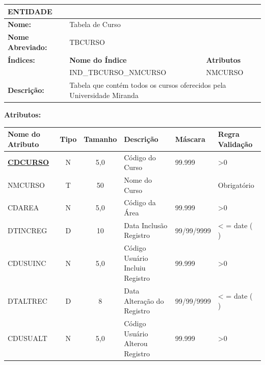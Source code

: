 \begin{landscape}

\footnotesize

\noindent
\begin{tabular}{|p{4.0cm}|p{12.0cm}|p{5.0cm}|}
\hline
\textbf{ENTIDADE} & & \\
\hline
\textbf{Nome:} & \multicolumn{2}{p{17.4cm}|}{Tabela de Curso} \\
\hline
\textbf{Nome Abreviado:} & \multicolumn{2}{p{17.4cm}|}{TBCURSO} \\
\hline
\textbf{Índices:} & \textbf{Nome do Índice} & \textbf{Atributos} \\
\hline
 & IND\_TBCURSO\_NMCURSO & NMCURSO \\
\hline
\textbf{Descrição:} & \multicolumn{2}{p{17.4cm}|}{Tabela que contém todos os cursos
oferecidos pela Universidade Miranda} \\
\hline
\end{tabular}

\vspace{0.4cm}

\noindent\textbf{Atributos:}

\noindent
\begin{tabular}{|p{3.6cm}|c|c|p{7.0cm}|p{2.8cm}|p{3.0cm}|}
\hline
\textbf{Nome do Atributo} & \textbf{Tipo} & \textbf{Tamanho} & \textbf{Descrição} &
\textbf{Máscara} & \textbf{Regra Validação} \\
\hline
\textbf{\underline{CDCURSO}} & N & 5,0 & Código do Curso & 99.999 & >0 \\
\hline
NMCURSO & T & 50 & Nome do Curso & & Obrigatório \\
\hline
CDAREA & N & 5,0 & Código da Área & 99.999 & >0 \\
\hline
DTINCREG & D & 10 & Data Inclusão Registro & 99/99/9999 & < = date ( ) \\
\hline
CDUSUINC & N & 5,0 & Código Usuário Incluiu Registro & 99.999 & >0 \\
\hline
DTALTREC & D & 8 & Data Alteração do Registro & 99/99/9999 & < = date ( ) \\
\hline
CDUSUALT & N & 5,0 & Código Usuário Alterou Registro & 99.999 & >0 \\
\hline
\end{tabular}

\vspace{1.0cm}


\end{landscape}
